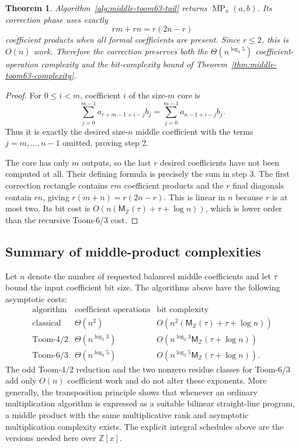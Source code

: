 \documentclass[11pt]{book}
\newtheorem{theorem}{Theorem}[section]
\theoremstyle{definition}
\newcommand{\ZZ}{\mathbb Z}
\newcommand{\MZ}{\mathsf M_{\ZZ}}
\begin{document}
\begin{theorem}\label{thm:middle-toom63-tail}
Algorithm~\ref{alg:middle-toom63-tail} returns
$\operatorname{MP}_n(a,b)$.  Its correction phase uses exactly
\[
 rm+rn=r(2n-r)
\]
coefficient products when all formal coefficients are present.  Since
$r\leq2$, this is $O(n)$ work.  Therefore the correction preserves both the
$\Theta(n^{\log_3 5})$ coefficient-operation complexity and the bit-complexity
bound of Theorem~\ref{thm:middle-toom63-complexity}.
\end{theorem}

\begin{proof}
For $0\leq i<m$, coefficient $i$ of the size-$m$ core is
\[
 \sum_{j=0}^{m-1}a_{r+m-1+i-j}b_j
 =\sum_{j=0}^{m-1}a_{n-1+i-j}b_j.
\]
Thus it is exactly the desired size-$n$ middle coefficient with the terms
$j=m,\ldots,n-1$ omitted, proving step 2.

The core has only $m$ outputs, so the last $r$ desired coefficients have not
been computed at all.  Their defining formula is precisely the sum in step 3.
The first correction rectangle contains $rm$ coefficient products and the
$r$ final diagonals contain $rn$, giving $r(m+n)=r(2n-r)$.  This is linear in
$n$ because $r$ is at most two.  Its bit cost is
$O(n(\MZ(\tau)+\tau+\log n))$, which is lower order than the recursive
Toom-6/3 cost.
\end{proof}

\subsection{Summary of middle-product complexities}

Let $n$ denote the number of requested balanced middle coefficients and let
$\tau$ bound the input coefficient bit size.  The algorithms above have the
following asymptotic costs:
\[
\begin{array}{c|c|c}
\text{algorithm} & \text{coefficient operations} & \text{bit complexity}\\
\hline
\text{classical} & \Theta(n^2) &
 O(n^2(\MZ(\tau)+\tau+\log n))\\
\text{Toom-4/2} & \Theta(n^{\log_2 3}) &
 O(n^{\log_2 3}\MZ(\tau+\log n))\\
\text{Toom-6/3} & \Theta(n^{\log_3 5}) &
 O(n^{\log_3 5}\MZ(\tau+\log n)).
\end{array}
\]
The odd Toom-4/2 reduction and the two nonzero residue classes for Toom-6/3
add only $O(n)$ coefficient work and do not alter these exponents.  More
generally, the transposition principle shows that whenever an ordinary
multiplication algorithm is expressed as a suitable bilinear straight-line
program, a middle product with the same multiplicative rank and asymptotic
multiplication complexity exists.  The explicit integral schedules above are
the versions needed here over $\ZZ[x]$.
\end{document}
